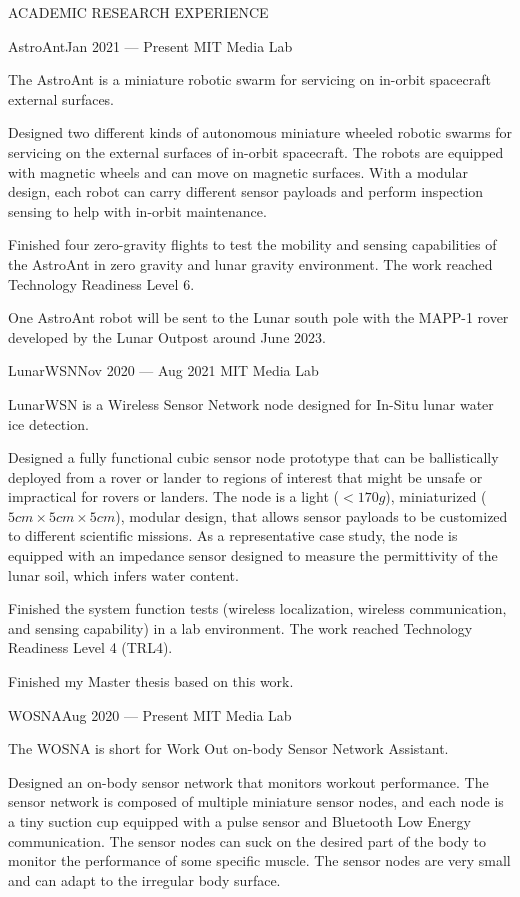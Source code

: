 \documentclass{resume} %
\begin{document}
\begin{rSection}{ACADEMIC RESEARCH EXPERIENCE}
\begin{rSubsection}{AstroAnt}{Jan 2021 --- Present}{ }{MIT Media Lab}
\item The AstroAnt is a miniature robotic swarm for servicing on in-orbit spacecraft external surfaces.
\item Designed two different kinds of autonomous miniature wheeled robotic swarms for servicing on the external surfaces of in-orbit spacecraft. The robots are equipped with magnetic wheels and can move on magnetic surfaces. With a modular design, each robot can carry different sensor payloads and perform inspection sensing to help with in-orbit maintenance.
\item Finished four zero-gravity flights to test the mobility and sensing capabilities of the AstroAnt in zero gravity and lunar gravity environment. The work reached Technology Readiness Level 6.
\item One AstroAnt robot will be sent to the Lunar south pole with the MAPP-1 rover developed by the Lunar Outpost around June 2023.
\end{rSubsection}

\begin{rSubsection}{LunarWSN}{Nov 2020 --- Aug 2021}{ }{MIT Media Lab}
\item LunarWSN is a Wireless Sensor Network node designed for In-Situ lunar water ice detection.
\item Designed a fully functional cubic sensor node prototype that can be ballistically deployed from a rover or lander to regions of interest that might be unsafe or impractical for rovers or landers. The node is a light ($<170g$), miniaturized ($5cm \times 5cm \times 5cm$), modular design, that allows sensor payloads to be customized to different scientific missions. As a representative case study, the node is equipped with an impedance sensor designed to measure the permittivity of the lunar soil, which infers water content.
\item Finished the system function tests (wireless localization, wireless communication, and sensing capability) in a lab environment. The work reached Technology Readiness Level 4 (TRL4).
\item Finished my Master thesis based on this work.
\end{rSubsection}

\begin{rSubsection}{WOSNA}{Aug 2020 --- Present}{ }{MIT Media Lab}
\item The WOSNA is short for Work Out on-body Sensor Network Assistant.
\item Designed an on-body sensor network that monitors workout performance. The sensor network is composed of multiple miniature sensor nodes, and each node is a tiny suction cup equipped with a pulse sensor and Bluetooth Low Energy communication. The sensor nodes can suck on the desired part of the body to monitor the performance of some specific muscle. The sensor nodes are very small and can adapt to the irregular body surface.
\end{rSubsection}


\end{rSection}
\end{document}

